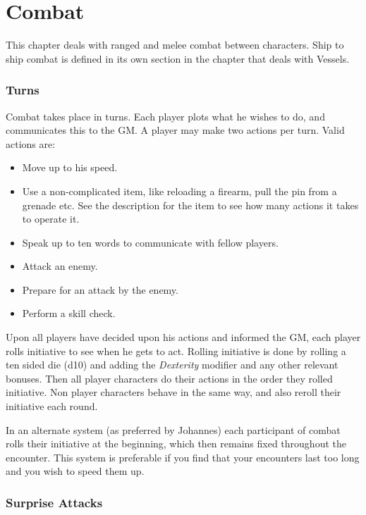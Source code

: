 \chapter{Combat}
\label{chap:Combat}


This chapter deals with ranged and melee combat between characters. Ship to ship
combat is defined in its own section in the chapter that deals with Vessels.

\subsection{Turns}

Combat takes place in turns. Each player plots what he wishes to do, and
communicates this to the GM. A player may make two actions per turn. Valid
actions are:

\begin{itemize}
\item Move up to his speed.
\item Use a non-complicated item, like reloading a firearm, pull the pin from a
  grenade etc. See the description for the item to see how many actions it takes
  to operate it.
\item Speak up to ten words to communicate with fellow players.
\item Attack an enemy.
\item Prepare for an attack by the enemy.
\item Perform a skill check.
\end{itemize}

Upon all players have decided upon his actions and informed the GM, each player
rolls initiative to see when he gets to act. Rolling initiative is done by
rolling a ten sided die (d10) and adding the \emph{Dexterity} modifier and any
other relevant bonuses. Then all player characters do their actions in the
order they rolled initiative. Non player characters behave in the same way,
and also reroll their initiative each round.

In an alternate system (as preferred by Johannes) each participant of combat
rolls their initiative at the beginning, which then remains fixed throughout the
encounter. This system is preferable if you find that your encounters last too
long and you wish to speed them up.

\subsection{Surprise Attacks}

